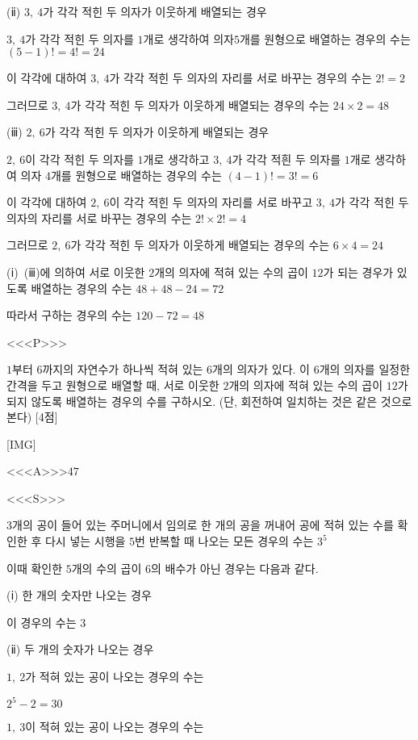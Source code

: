 \documentclass{oblivoir}
\begin{document}
(ⅱ) $3,\: 4$가 각각 적힌 두 의자가 이웃하게 배열되는 경우

$3,\: 4$가 각각 적힌 두 의자를 $1$개로 생각하여 의자$5$개를 원형으로 배열하는 경우의 수는 $(5-1)! =4! =24$

이 각각에 대하여 $3,\: 4$가 각각 적힌 두 의자의 자리를 서로 바꾸는 경우의 수는 $2! =2$ 

그러므로 $3,\: 4$가 각각 적힌 두 의자가 이웃하게 배열되는 경우의 수는 $24\times 2=48$

(ⅲ) $2,\: 6$가 각각 적힌 두 의자가 이웃하게 배열되는 경우

$2,\: 6$이 각각 적힌 두 의자를 $1$개로 생각하고 $3,\: 4$가 각각 적흰 두 의자를 $1$개로 생각하여 의자 $4$개를 원형으로 배열하는 경우의 수는 $(4-1)! =3! =6$

이 각각에 대하여 $2,\: 6$이 각각 적힌 두 의자의 자리를 서로 바꾸고 $3,\: 4$가 각각 적힌 두 의자의 자리를 서로 바꾸는 경우의 수는 $2!\times 2! =4$

그러므로 $2,\: 6$가 각각 적힌 두 의자가 이웃하게 배열되는 경우의 수는 $6\times 4=24$

(ⅰ)~(ⅲ)에 의하여 서로 이웃한 $2$개의 의자에 적혀 있는 수의 곱이 $12$가 되는 경우가 있도록 배열하는 경우의 수는 $48+48-24=72$

따라서 구하는 경우의 수는 $120-72=48$

<<<P>>>

$1$부터 $6$까지의 자연수가 하나씩 적혀 있는 $6$개의 의자가 있다. 이 $6$개의 의자를 일정한 간격을 두고 원형으로 배열할 때, 서로 이웃한 $2$개의 의자에 적혀 있는 수의 곱이 $12$가 되지 않도록 배열하는 경우의 수를 구하시오. (단, 회전하여 일치하는 것은 같은 것으로 본다) [4점]

[IMG]

<<<A>>>$47$

<<<S>>>

$3$개의 공이 들어 있는 주머니에서 임의로 한 개의 공을 꺼내어 공에 적혀 있는 수를 확인한 후 다시 넣는 시행을 $5$번 반복할 때 나오는 모든 경우의 수는 $3^{5}$

이때 확인한 $5$개의 수의 곱이 $6$의 배수가 아닌 경우는 다음과 같다.

(ⅰ) 한 개의 숫자만 나오는 경우

이 경우의 수는 $3$

(ⅱ) 두 개의 숫자가 나오는 경우

$1,\: 2$가 적혀 있는 공이 나오는 경우의 수는

$2^{5}-2=30$

$1,\: 3$이 적혀 있는 공이 나오는 경우의 수는
\end{document}
